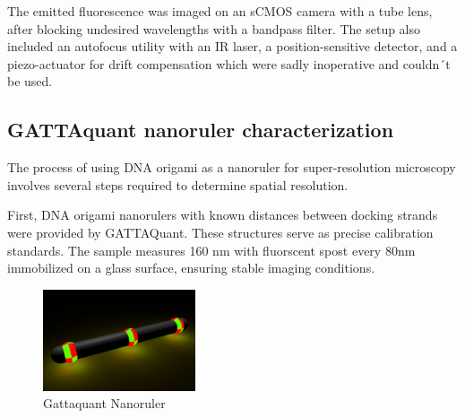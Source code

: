\documentclass[a4paper,english,12pt,bibliography=totoc]{scrreprt}
\begin{document}
The emitted fluorescence was imaged on an sCMOS camera with a tube lens, after blocking undesired wavelengths with a bandpass filter. The setup also included an autofocus utility with an IR laser, a position-sensitive detector, and a piezo-actuator for drift compensation which were sadly inoperative and couldn´t be used.





\subsection{GATTAquant nanoruler characterization}

The process of using DNA origami as a nanoruler for super-resolution microscopy involves several steps required  to determine spatial resolution.

First, DNA origami nanorulers with known distances between docking strands were provided by GATTAQuant. These structures serve as precise calibration standards. The sample measures 160 nm with fluorscent spost every 80nm immobilized on a glass surface, ensuring stable imaging conditions.

\begin{figure}[h] %
  \centering
  \includegraphics[width=0.4\textwidth]{image_manager__product_images_thumbnail_dna_origami_based_dna_paint_80rg_nanoruler_for_super-resolution_microscopy.png} %
  \caption{Gattaquant Nanoruler}
  \label{fig:example}
\end{figure}
\end{document}
